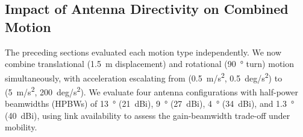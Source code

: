 \documentclass[fleqn,10pt]{wlscirep}
\begin{document}
\subsection*{Impact of Antenna Directivity on Combined Motion}

The preceding sections evaluated each motion type independently. We now combine translational (\SI{1.5}{m} displacement) and rotational (\SI{90}{\degree} turn) motion simultaneously, with acceleration escalating from (\SI{0.5}{m/s^2}, \SI{0.5}{deg/s^2}) to (\SI{5}{m/s^2}, \SI{200}{deg/s^2}). We evaluate four antenna configurations with half-power beamwidths (HPBWs) of \SI{13}{\degree} (\SI{21}{dBi}), \SI{9}{\degree} (\SI{27}{dBi}), \SI{4}{\degree} (\SI{34}{dBi}), and \SI{1.3}{\degree} (\SI{40}{dBi}), using link availability to assess the gain-beamwidth trade-off under mobility.
\end{document}
